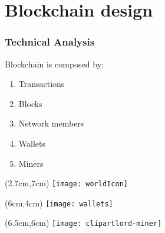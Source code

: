 \section{Blockchain design}
\begin{frame}
 \frametitle{Technical Analysis}

 Blockchain is composed by:
 \begin{enumerate}
  \item Transactions
  \item Blocks
  \item Network members
  \item Wallets
  \item Miners
 \end{enumerate}


 \begin{textblock*}{5cm}(2.7cm,7cm)
  \texttt{[image: worldIcon]}
 \end{textblock*}

 \begin{textblock*}{5cm}(6cm,4cm)
  \texttt{[image: wallets]}
 \end{textblock*}

 \begin{textblock*}{5cm}(6.5cm,6cm)
  \texttt{[image: clipartlord-miner]}
 \end{textblock*}


\end{frame}

